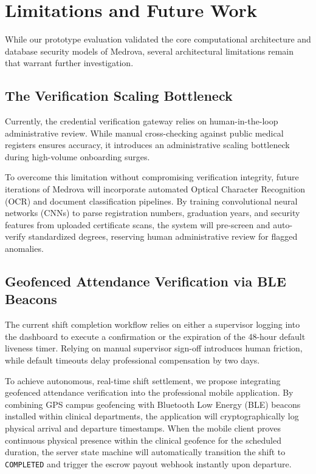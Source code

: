 \documentclass[conference]{IEEEtran}
\begin{document}
\section{Limitations and Future Work}
While our prototype evaluation validated the core computational architecture and database security models of Medrova, several architectural limitations remain that warrant further investigation.

\subsection{The Verification Scaling Bottleneck}
Currently, the credential verification gateway relies on human-in-the-loop administrative review. While manual cross-checking against public medical registers \cite{nmc2023register} ensures accuracy, it introduces an administrative scaling bottleneck during high-volume onboarding surges. 

To overcome this limitation without compromising verification integrity, future iterations of Medrova will incorporate automated Optical Character Recognition (OCR) and document classification pipelines. By training convolutional neural networks (CNNs) to parse registration numbers, graduation years, and security features from uploaded certificate scans, the system will pre-screen and auto-verify standardized degrees, reserving human administrative review for flagged anomalies.

\subsection{Geofenced Attendance Verification via BLE Beacons}
The current shift completion workflow relies on either a supervisor logging into the dashboard to execute a confirmation or the expiration of the 48-hour default liveness timer. Relying on manual supervisor sign-off introduces human friction, while default timeouts delay professional compensation by two days.

To achieve autonomous, real-time shift settlement, we propose integrating geofenced attendance verification into the professional mobile application. By combining GPS campus geofencing with Bluetooth Low Energy (BLE) beacons installed within clinical departments, the application will cryptographically log physical arrival and departure timestamps. When the mobile client proves continuous physical presence within the clinical geofence for the scheduled duration, the server state machine will automatically transition the shift to \texttt{COMPLETED} and trigger the escrow payout webhook instantly upon departure.
\end{document}

